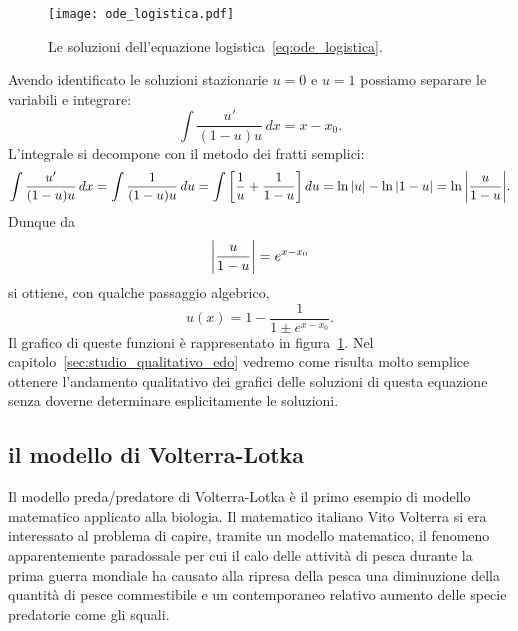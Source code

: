 \begin{figure}
  \texttt{[image: ode\_logistica.pdf]}
  \caption{
Le soluzioni dell'equazione logistica~\eqref{eq:ode_logistica}.
}
\label{fig:ode_logistica}
\end{figure}

Avendo identificato le soluzioni stazionarie $u=0$ e $u=1$ possiamo separare le variabili
e integrare:
\[
 \int \frac{u'}{(1-u)u}\, dx = x - x_0.
\]
L'integrale si decompone con il metodo dei fratti semplici:
\[
  \int \frac{u'}{(1-u)u}\, dx
  = \int \frac{1}{(1-u)u}\, du 
  = \int {\left[ \frac{1}{u} + \frac{1}{1-u} \right]}\, du 
  = \ln {\left|u\right|} - \ln{\left|1-u\right|}
  = \ln {\left|\frac{u}{1-u}\right|}.
\]
Dunque da 
\[
{\left|\frac{u}{1-u}\right|} = e^{x-x_0}  
\]
si ottiene, con qualche passaggio algebrico,
\[
    u(x) = 1 - \frac{1}{1\pm e^{x-x_0}}.
\]
Il grafico di queste funzioni è rappresentato in figura~\ref{fig:ode_logistica}.
Nel capitolo~\ref{sec:studio_qualitativo_edo}
vedremo come risulta molto semplice ottenere l'andamento qualitativo dei grafici 
delle soluzioni di questa equazione senza doverne determinare esplicitamente 
le soluzioni.

\subsection{il modello di Volterra-Lotka}
%
%
%
%

Il modello preda/predatore di Volterra-Lotka è il primo esempio 
di modello matematico applicato alla biologia.
%
Il matematico italiano Vito Volterra si era interessato al problema 
di capire, tramite un modello matematico, il fenomeno apparentemente 
paradossale per cui il calo delle attività di pesca 
durante la prima guerra mondiale ha causato alla ripresa della pesca 
una diminuzione della 
quantità di pesce commestibile e un contemporaneo relativo aumento delle 
specie predatorie come gli squali.

